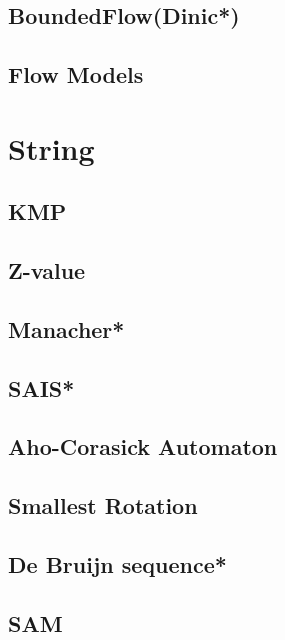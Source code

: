 \subsection{BoundedFlow(Dinic*)} %

\subsection{Flow Models}

% 


\section{String}
\subsection{KMP}

\subsection{Z-value}

\subsection{Manacher*} %

\subsection{SAIS*}

\subsection{Aho-Corasick Automaton}

\subsection{Smallest Rotation}

\subsection{De Bruijn sequence*} %

\subsection{SAM}

